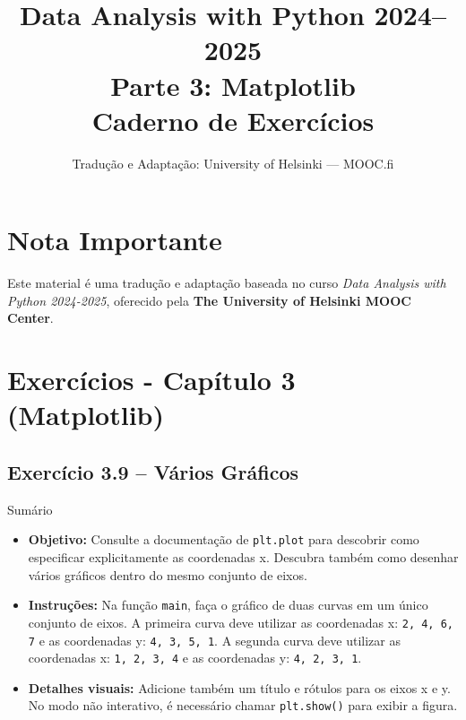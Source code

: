 \documentclass[11pt,a4paper]{article}
\title{\textbf{Data Analysis with Python 2024--2025}\\Parte 3: Matplotlib\\\large Caderno de Exercícios}
\author{Tradução e Adaptação: University of Helsinki --- MOOC.fi}
\date{}
\begin{document}
\maketitle

\section*{Nota Importante}
Este material é uma tradução e adaptação baseada no curso \textit{Data Analysis with Python 2024-2025}, oferecido pela \textbf{The University of Helsinki MOOC Center}.

\tableofcontents
\newpage

\section{Exercícios - Capítulo 3 (Matplotlib)}

\subsection*{Exercício 3.9 -- Vários Gráficos}
\begin{exercicio}{Sumário}
\begin{itemize}
    \item \textbf{Objetivo:} Consulte a documentação de \texttt{plt.plot} para descobrir como especificar explicitamente as coordenadas x. Descubra também como desenhar vários gráficos dentro do mesmo conjunto de eixos.
    \item \textbf{Instruções:} Na função \texttt{main}, faça o gráfico de duas curvas em um único conjunto de eixos. A primeira curva deve utilizar as coordenadas x: \texttt{2, 4, 6, 7} e as coordenadas y: \texttt{4, 3, 5, 1}. A segunda curva deve utilizar as coordenadas x: \texttt{1, 2, 3, 4} e as coordenadas y: \texttt{4, 2, 3, 1}.
    \item \textbf{Detalhes visuais:} Adicione também um título e rótulos para os eixos x e y. No modo não interativo, é necessário chamar \texttt{plt.show()} para exibir a figura.
\end{itemize}
\end{exercicio}
\end{document}
